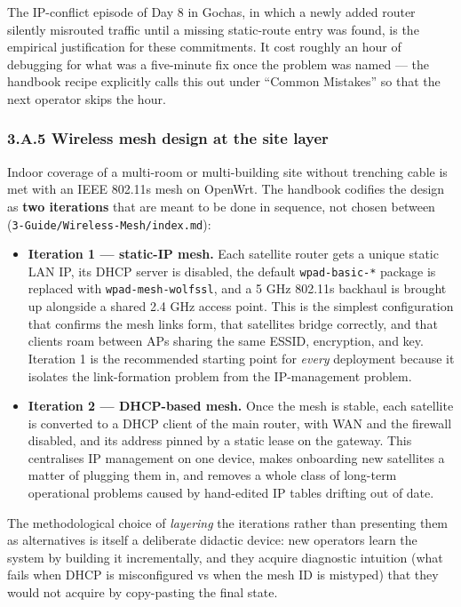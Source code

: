 The IP-conflict episode of Day 8 in Gochas, in which a newly added
router silently misrouted traffic until a missing static-route entry was
found, is the empirical justification for these commitments. It cost
roughly an hour of debugging for what was a five-minute fix once the
problem was named --- the handbook recipe explicitly calls this out
under ``Common Mistakes'' so that the next operator skips the hour.

\hypertarget{a.5-wireless-mesh-design-at-the-site-layer}{%
\subsubsection{3.A.5 Wireless mesh design at the site
layer}\label{a.5-wireless-mesh-design-at-the-site-layer}}

Indoor coverage of a multi-room or multi-building site without trenching
cable is met with an IEEE 802.11s mesh on OpenWrt. The handbook codifies
the design as \textbf{two iterations} that are meant to be done in
sequence, not chosen between (\texttt{3-Guide/Wireless-Mesh/index.md}):

\begin{itemize}
\tightlist
\item
  \textbf{Iteration 1 --- static-IP mesh.} Each satellite router gets a
  unique static LAN IP, its DHCP server is disabled, the default
  \texttt{wpad-basic-*} package is replaced with
  \texttt{wpad-mesh-wolfssl}, and a 5 GHz 802.11s backhaul is brought up
  alongside a shared 2.4 GHz access point. This is the simplest
  configuration that confirms the mesh links form, that satellites
  bridge correctly, and that clients roam between APs sharing the same
  ESSID, encryption, and key. Iteration 1 is the recommended starting
  point for \emph{every} deployment because it isolates the
  link-formation problem from the IP-management problem.
\item
  \textbf{Iteration 2 --- DHCP-based mesh.} Once the mesh is stable,
  each satellite is converted to a DHCP client of the main router, with
  WAN and the firewall disabled, and its address pinned by a static
  lease on the gateway. This centralises IP management on one device,
  makes onboarding new satellites a matter of plugging them in, and
  removes a whole class of long-term operational problems caused by
  hand-edited IP tables drifting out of date.
\end{itemize}

The methodological choice of \emph{layering} the iterations rather than
presenting them as alternatives is itself a deliberate didactic device:
new operators learn the system by building it incrementally, and they
acquire diagnostic intuition (what fails when DHCP is misconfigured vs
when the mesh ID is mistyped) that they would not acquire by
copy-pasting the final state.

